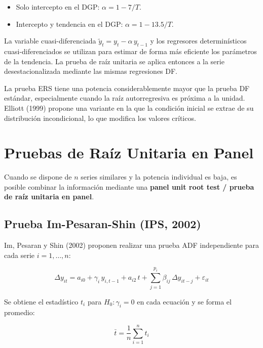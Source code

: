\documentclass[12pt]{article}
\begin{document}
\begin{itemize}
  \item Solo intercepto en el DGP: $\alpha = 1 - 7/T$.
  \item Intercepto y tendencia en el DGP: $\alpha = 1 - 13.5/T$.
\end{itemize}

La variable cuasi-diferenciada $\tilde{y}_t = y_t - \alpha\,y_{t-1}$ y
los regresores determin\'isticos cuasi-diferenciados se utilizan para
estimar de forma m\'as eficiente los par\'ametros de la tendencia. La
prueba de ra\'iz unitaria se aplica entonces a la serie desestacionalizada
mediante las mismas regresiones DF.

La prueba ERS tiene una potencia considerablemente mayor que la prueba DF
est\'andar, especialmente cuando la ra\'iz autorregresiva es pr\'oxima
a la unidad. Elliott (1999) propone una variante en la que la condici\'on
inicial se extrae de su distribuci\'on incondicional, lo que modifica
los valores cr\'iticos.

\section{Pruebas de Ra\'iz Unitaria en Panel}

Cuando se dispone de $n$ series similares y la potencia individual es
baja, es posible combinar la informaci\'on mediante una
\textbf{panel unit root test / prueba de ra\'iz unitaria en panel}.

\subsection{Prueba Im-Pesaran-Shin (IPS, 2002)}

Im, Pesaran y Shin (2002) proponen realizar una prueba ADF independiente
para cada serie $i = 1,\ldots,n$:

\begin{equation}
  \Delta y_{it} = a_{i0} + \gamma_i\,y_{i,t-1} + a_{i2}\,t
                  + \sum_{j=1}^{p_i}\beta_{ij}\,\Delta y_{it-j}
                  + \varepsilon_{it}
\end{equation}

Se obtiene el estad\'istico $t_i$ para $H_0\colon \gamma_i = 0$ en
cada ecuaci\'on y se forma el promedio:

\begin{equation}
  \bar{t} = \frac{1}{n}\sum_{i=1}^{n} t_i
\end{equation}
\end{document}
